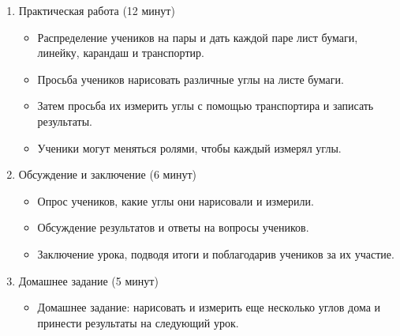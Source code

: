 \documentclass[a4paper,12pt]{article}
\begin{document}
\begin{enumerate}
\item Практическая работа (12 минут)
	\begin{itemize}
	\item Распределение учеников на пары и дать каждой паре лист бумаги, линейку, карандаш и транспортир.
	\item Просьба учеников нарисовать различные углы на листе бумаги.
	\item Затем просьба их измерить углы с помощью транспортира и записать результаты.
	\item Ученики могут меняться ролями, чтобы каждый измерял углы.
	\end{itemize}

\item Обсуждение и заключение (6 минут)
	\begin{itemize}
	\item Опрос учеников, какие углы они нарисовали и измерили.
	\item Обсуждение результатов и ответы на вопросы учеников.
	\item Заключение урока, подводя итоги и поблагодарив учеников за их участие.
	\end{itemize}

\item Домашнее задание (5 минут)
	\begin{itemize}
	\item Домашнее задание: нарисовать и измерить еще несколько углов дома и принести результаты на следующий урок.
	\end{itemize}
\end{enumerate}
\end{document}

